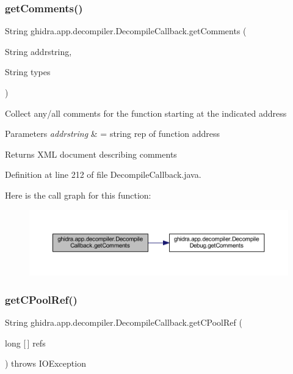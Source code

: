 \subsubsection{\texorpdfstring{getComments()}{getComments()}}
{\footnotesize\ttfamily String ghidra.\+app.\+decompiler.\+Decompile\+Callback.\+get\+Comments (\begin{DoxyParamCaption}\item[{String}]{addrstring,  }\item[{String}]{types }\end{DoxyParamCaption})\hspace{0.3cm}{\ttfamily [inline]}}

Collect any/all comments for the function starting at the indicated address


\begin{DoxyParams}{Parameters}
{\em addrstring} & = string rep of function address \\
\hline
\end{DoxyParams}
\begin{DoxyReturn}{Returns}
X\+ML document describing comments 
\end{DoxyReturn}


Definition at line 212 of file Decompile\+Callback.\+java.

Here is the call graph for this function\+:
\nopagebreak
\begin{figure}[H]
\begin{center}
\leavevmode
\includegraphics[width=350pt]{classghidra_1_1app_1_1decompiler_1_1_decompile_callback_a4d424166efdabe663d16e4cd27e76db3_cgraph}
\end{center}
\end{figure}
\mbox{\label{classghidra_1_1app_1_1decompiler_1_1_decompile_callback_a238684d11918f682f50c0636f0a467ad}} 
\subsubsection{\texorpdfstring{getCPoolRef()}{getCPoolRef()}}
{\footnotesize\ttfamily String ghidra.\+app.\+decompiler.\+Decompile\+Callback.\+get\+C\+Pool\+Ref (\begin{DoxyParamCaption}\item[{long \mbox{[}$\,$\mbox{]}}]{refs }\end{DoxyParamCaption}) throws I\+O\+Exception\hspace{0.3cm}{\ttfamily [inline]}}



